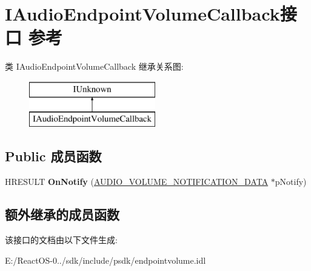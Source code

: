 \hypertarget{interface_i_audio_endpoint_volume_callback}{}\section{I\+Audio\+Endpoint\+Volume\+Callback接口 参考}
\label{interface_i_audio_endpoint_volume_callback}
类 I\+Audio\+Endpoint\+Volume\+Callback 继承关系图\+:\begin{figure}[H]
\begin{center}
\leavevmode
\includegraphics[height=2.000000cm]{interface_i_audio_endpoint_volume_callback}
\end{center}
\end{figure}
\subsection*{Public 成员函数}
\begin{DoxyCompactItemize}
\item 
\mbox{\label{interface_i_audio_endpoint_volume_callback_a063b058ce94824cbeef2bc71f036ced7}} 
H\+R\+E\+S\+U\+LT {\bfseries On\+Notify} (\hyperlink{struct_a_u_d_i_o___v_o_l_u_m_e___n_o_t_i_f_i_c_a_t_i_o_n___d_a_t_a}{A\+U\+D\+I\+O\+\_\+\+V\+O\+L\+U\+M\+E\+\_\+\+N\+O\+T\+I\+F\+I\+C\+A\+T\+I\+O\+N\+\_\+\+D\+A\+TA} $\ast$p\+Notify)
\end{DoxyCompactItemize}
\subsection*{额外继承的成员函数}


该接口的文档由以下文件生成\+:\begin{DoxyCompactItemize}
\item 
E\+:/\+React\+O\+S-\/0../sdk/include/psdk/endpointvolume.\+idl\end{DoxyCompactItemize}
